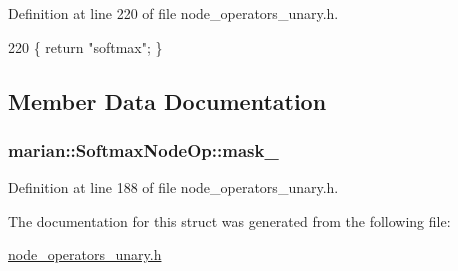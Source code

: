 Definition at line 220 of file node\+\_\+operators\+\_\+unary.\+h.


\begin{DoxyCode}
220 \{ \textcolor{keywordflow}{return} \textcolor{stringliteral}{"softmax"}; \}
\end{DoxyCode}


\subsection{Member Data Documentation}
\subsubsection[{\texorpdfstring{mask\+\_\+}{mask_}}]{ marian\+::\+Softmax\+Node\+Op\+::mask\+\_\+}\hypertarget{structmarian_1_1SoftmaxNodeOp_a7870175f2ecadbb4ec71de714f3c6519}{}\label{structmarian_1_1SoftmaxNodeOp_a7870175f2ecadbb4ec71de714f3c6519}


Definition at line 188 of file node\+\_\+operators\+\_\+unary.\+h.



The documentation for this struct was generated from the following file\+:\begin{DoxyCompactItemize}
\item 
\hyperlink{node__operators__unary_8h}{node\+\_\+operators\+\_\+unary.\+h}\end{DoxyCompactItemize}
